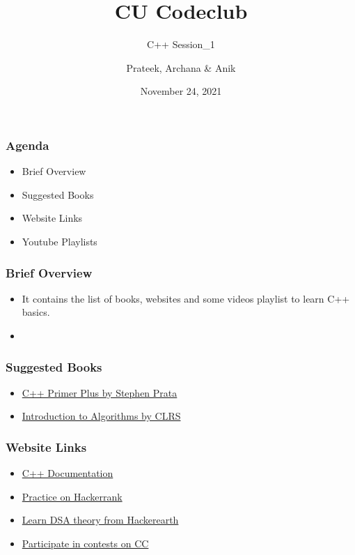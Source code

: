 \documentclass[12pt]{beamer}
\author {Prateek, Archana \& Anik}
\title {CU Codeclub}
\subtitle {C++ Session\_1}
\date {November 24, 2021}
\begin{document}
\begin {frame}
\maketitle
\end {frame}

\begin {frame}
    \frametitle {Agenda}
    \begin {itemize}
        \item {Brief Overview}   
        \item {Suggested Books}  
        \item {Website Links} 
        \item {Youtube Playlists}
\end {itemize}       
\end {frame} 
          
           
\begin {frame}
    \frametitle {Brief Overview}
    \begin {itemize}
        \item {It contains the list of books, websites and some videos playlist to learn C++ basics.}   
        \item {}  
	\end {itemize}       
\end {frame} 


\begin {frame}
    \frametitle {Suggested Books}
    \begin {itemize}          
        \item \href {https://zhjwpku.com/assets/pdf/books/C++.Primer.Plus.6th.Edition.Oct.2011.pdf} {C++ Primer Plus by Stephen Prata}  
       
        \item  \href {https://edutechlearners.com/download/Introduction\_to\_algorithms-3rd\%20Edition.pdf}  {Introduction to Algorithms by CLRS}     
       
    \end {itemize}        
\end {frame}  

   
\begin {frame}
    \frametitle {Website Links}
    \begin {itemize} 
             
        \item \href {https://devdocs.io/cpp/}{C++ Documentation}
        \item \href {https://www.hackerrank.com/domains/cpp}{Practice on Hackerrank}
        \item \href {https://www.hackerearth.com/practice/}{Learn DSA theory from Hackerearth}
        \item \href {https://www.codechef.com/}{Participate in contests on CC} 
             
    \end {itemize}        
\end {frame}
   
\end{document}
